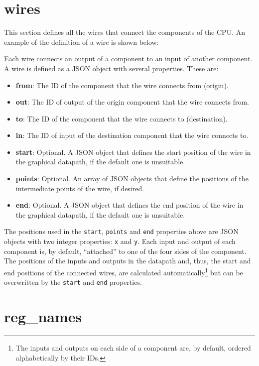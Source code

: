 \documentclass[11pt,a4paper,twoside,titlepage]{report}
\begin{document}
\section{wires}

This section defines all the wires that connect the components of the CPU.
An example of the definition of a wire is shown below:



Each wire connects an output of a component to an input of another component.
A wire is defined as a JSON object with several properties.
These are:

\begin{itemize}
	\item \textbf{from}: The ID of the component that the wire connects from (origin).
	\item \textbf{out}: The ID of output of the origin component that the wire
		connects from.
	\item \textbf{to}: The ID of the component that the wire connects to (destination).
	\item \textbf{in}: The ID of input of the destination component that the wire
		connects to.
	\item \textbf{start}: Optional. A JSON object that defines the start position of
		the wire in the graphical datapath, if the default one is unsuitable.
	\item \textbf{points}: Optional. An array of JSON objects that define the
		positions of the intermediate points of the wire, if desired.
	\item \textbf{end}: Optional. A JSON object that defines the end position of
		the wire in the graphical datapath, if the default one is unsuitable.
\end{itemize}

The positions used in the \verb+start+, \verb+points+ and \verb+end+ properties
above are JSON objects with two integer properties: \verb+x+ and \verb+y+.
Each input and output of each component is, by default, ``attached'' to one of
the four sides of the component.
The positions of the inputs and outputs in the datapath and, thus, the start and
end positions of the connected wires, are calculated automatically\footnote{The
inputs and outputs on each side of a component are, by default, ordered 
alphabetically by their IDs.} but can be overwritten by the \verb+start+ and 
\verb+end+ properties.


\section{reg\_names}
\end{document}
